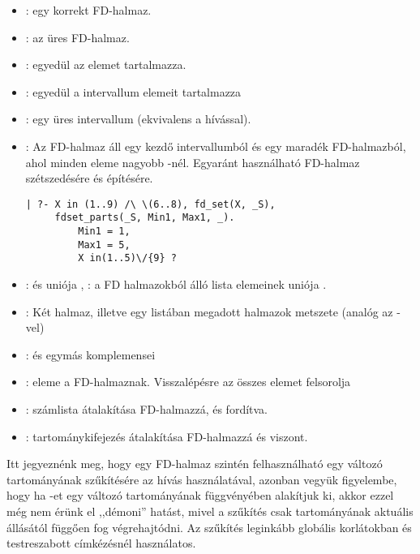 \begin{itemize}
\item {}:  egy korrekt FD-halmaz.
\item {}:  az üres FD-halmaz.
\item {}:  egyedül az  elemet tartalmazza.
\item {}:  egyedül a 
intervallum elemeit tartalmazza
\item {}:  egy üres intervallum
(ekvivalens a  hívással).
\item {}: Az  FD-halmaz áll egy
 kezdő intervallumból és egy  maradék FD-halmazból, ahol
 minden eleme nagyobb -nél. Egyaránt használható
FD-halmaz szétszedésére és építésére.
\begin{verbatim}
| ?- X in (1..9) /\ \(6..8), fd_set(X, _S),
     fdset_parts(_S, Min1, Max1, _).
         Min1 = 1,
         Max1 = 5,
         X in(1..5)\/{9} ?
\end{verbatim}
\item {}:  és 
uniója ,
: a  FD halmazokból
álló lista elemeinek uniója .
\item {} : Két halmaz, illetve egy listában
megadott halmazok metszete (analóg az -vel)
\item {}:  és  egymás
komplemensei
\item {}:  eleme a  FD-halmaznak.
Visszalépésre az összes elemet felsorolja
\item {}: számlista
átalakítása FD-halmazzá, és fordítva.
\item {}:
tartománykifejezés átalakítása FD-halmazzá és viszont.
\end{itemize}

Itt jegyeznénk meg, hogy egy FD-halmaz szintén felhasználható egy változó
tartományának szűkítésére az  hívás használatával, azonban
vegyük figyelembe, hogy ha -et egy  változó tartományának
függvényében alakítjuk ki, akkor ezzel még nem érünk el ,,démoni'' hatást,
mivel a szűkítés csak  tartományának aktuális állásától függően
fog végrehajtódni. Az  szűkítés leginkább globális korlátokban
és testreszabott címkézésnél használatos.

